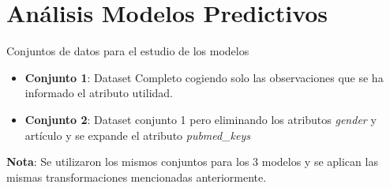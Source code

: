 \documentclass[10pt]{beamer}
\begin{document}
\section{Análisis Modelos Predictivos}

\begin{frame}{Conjuntos de datos para el estudio de los modelos}
  \begin{itemize}
  	\item \textbf{Conjunto 1}: Dataset Completo cogiendo solo las observaciones que se ha informado el atributo utilidad.
  	\item \textbf{Conjunto 2}: Dataset conjunto 1 pero eliminando los atributos \textit{gender} y artículo y se expande el atributo \textit{pubmed\_keys}
  \end{itemize}
  \textbf{Nota}: Se utilizaron los mismos conjuntos para los 3 modelos y se aplican las mismas transformaciones mencionadas anteriormente.
\end{frame}
\end{document}
